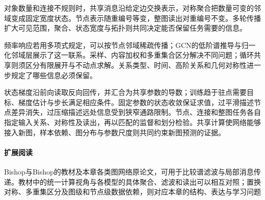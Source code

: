 对象数量和连接不规则时，共享消息沿给定边交换表示，对称聚合把数量可变的邻域变成固定宽度状态。节点表示随重编号等变，整图读出对重编号不变。多轮传播扩大可见范围，聚合、状态宽度与拓扑则共同决定能否保留任务需要的信息。

频率响应若用多项式规定，可以按节点邻域稀疏传播；GCN的低阶谱推导与归一化邻域层展示了这一联系。采样、内容加权和多重集合区分解决不同问题；循环共享则须区分有限展开与不动点求解。关系类型、时间、高阶关系和几何对称性进一步规定了哪些信息必须保留。

状态梯度沿前向读取反向回传，并汇合为共享参数的导数；训练趋于驻点需要目标、梯度估计与步长满足相应条件。固定参数的状态收敛保证求值，过平滑描述节点差异消失，过压缩描述远处信息受到狭窄通路限制。节点、连接和整图任务各自指定输入关系、对称性及读出，再以匹配的监督和划分检验。共享计算使网络能够接入新图，样本依赖、图分布与参数尺度则共同约束新图预测的证据。

\paragraph{扩展阅读}
Bishop与Bishop的教材及本章各类图网络原论文，可用于比较谱滤波与局部消息传递。教材中的统一计算视角与各模型的具体聚合、滤波和读出可以相互对照；置换对称、多重集区分及图级和节点级数据依赖，则对应本章的结构、表达与学习问题

